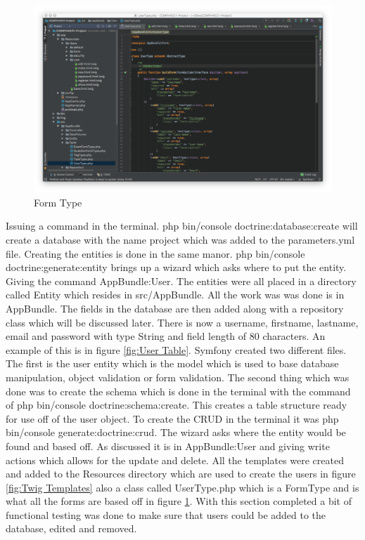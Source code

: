 \begin{figure}[htbp]
   \centering
   \includegraphics[width=400pt]{figures/form_type.png} %
   \caption{Form Type}
   \label{fig:Form Type}
\end{figure}

Issuing a command in the terminal. php bin/console doctrine:database:create will create a database with the name project which was added to the parameters.yml file. Creating the entities is done in the same manor. php bin/console doctrine:generate:entity brings up a wizard which asks where to put the entity. Giving the command AppBundle:User. The entities were all placed in a directory called Entity which resides in src/AppBundle. All the work was was done is in AppBundle. The fields in the database are then added along with a repository class which will be discussed later. There is now a username, firstname, lastname, email and password with type String and field length of 80 characters. An example of this is in figure \ref{fig:User Table}. Symfony created two different files. The first is the user entity which is the model which is used to base database manipulation, object validation or form validation. The second thing which was done was to create the schema which is done in the terminal with the command of php bin/console doctrine:schema:create. This creates a table structure ready for use off of the user object. To create the CRUD in the terminal it was php bin/console generate:doctrine:crud. The wizard asks where the entity would be found and based off. As discussed it is in AppBundle:User and giving write actions which allows for the update and delete. All the templates were created and added to the Resources directory which are used to create the users in figure \ref{fig:Twig Templates} also a class called UserType.php which is a FormType and is what all the forms are based off in figure \ref{fig:Form Type}. With this section completed a bit of functional testing was done to make sure that users could be added to the database, edited and removed.

